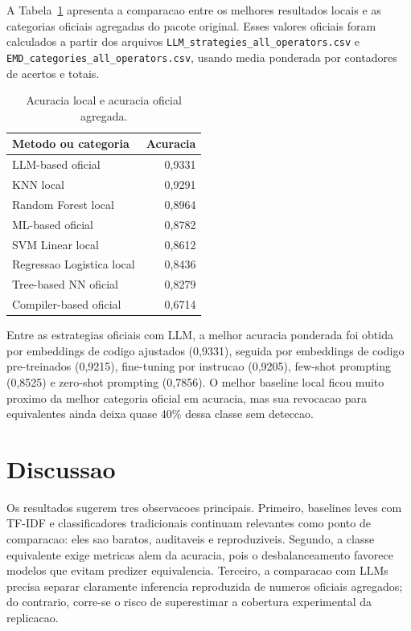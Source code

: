 \documentclass[sigconf,screen,nonacm]{acmart}
\begin{document}
A Tabela~\ref{tab:oficiais} apresenta a comparacao entre os melhores resultados locais e as categorias oficiais agregadas do pacote original. Esses valores oficiais foram calculados a partir dos arquivos \texttt{LLM\_strategies\_all\_operators.csv} e \texttt{EMD\_categories\_all\_operators.csv}, usando media ponderada por contadores de acertos e totais.

\begin{table}[t]
  \centering
  \caption{Acuracia local e acuracia oficial agregada.}
  \label{tab:oficiais}
  \small
  \begin{tabular}{lr}
    \toprule
    Metodo ou categoria & Acuracia \\
    \midrule
    LLM-based oficial & 0,9331 \\
    KNN local & 0,9291 \\
    Random Forest local & 0,8964 \\
    ML-based oficial & 0,8782 \\
    SVM Linear local & 0,8612 \\
    Regressao Logistica local & 0,8436 \\
    Tree-based NN oficial & 0,8279 \\
    Compiler-based oficial & 0,6714 \\
    \bottomrule
  \end{tabular}
\end{table}

Entre as estrategias oficiais com LLM, a melhor acuracia ponderada foi obtida por embeddings de codigo ajustados (0,9331), seguida por embeddings de codigo pre-treinados (0,9215), fine-tuning por instrucao (0,9205), few-shot prompting (0,8525) e zero-shot prompting (0,7856). O melhor baseline local ficou muito proximo da melhor categoria oficial em acuracia, mas sua revocacao para equivalentes ainda deixa quase 40\% dessa classe sem deteccao.

\section{Discussao}

Os resultados sugerem tres observacoes principais. Primeiro, baselines leves com TF-IDF e classificadores tradicionais continuam relevantes como ponto de comparacao: eles sao baratos, auditaveis e reproduziveis. Segundo, a classe equivalente exige metricas alem da acuracia, pois o desbalanceamento favorece modelos que evitam predizer equivalencia. Terceiro, a comparacao com LLMs precisa separar claramente inferencia reproduzida de numeros oficiais agregados; do contrario, corre-se o risco de superestimar a cobertura experimental da replicacao.
\end{document}
